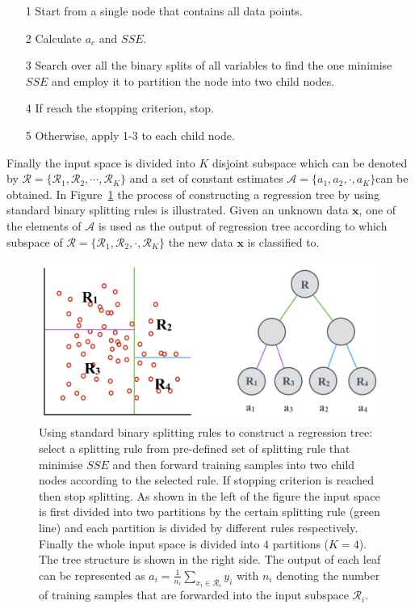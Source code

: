 \documentclass{tutmscthesis}[2010/09/22]
\numberwithin{equation}{section}
\numberwithin{table}{section}
\numberwithin{figure}{section}
\renewcommand{\vec}[1]{\bm{#1}}
\begin{document}
\begin{itemize}
\item[1] Start from a single node that contains all data points. 
\item[2] Calculate $a_c$ and $SSE$.
\item[3] Search over all the binary splits of all variables to find the one minimise $SSE$ and employ it to partition the node into two child nodes.
\item[4] If reach the stopping criterion, stop.
\item[5] Otherwise, apply 1-3 to each child node.
\end{itemize}

Finally the input space is divided into $K$ disjoint subspace which can be denoted by $\mathcal{R} = \{\mathcal{R}_1, \mathcal{R}_2, \cdots, \mathcal{R}_K \}$ and a set of constant estimates $\mathcal{A}=\{a_1, a_2, \cdot, a_K\}$can be obtained.
In Figure~\ref{Fig:regressiontree} the process of constructing a regression tree by using standard binary splitting rules is illustrated. Given an unknown data $\vec{x}$, one of the elements of $\mathcal{A}$ is used as the output of regression tree according to which subspace of $\mathcal{R} = \{\mathcal{R}_1, \mathcal{R}_2, \cdot, \mathcal{R}_K \}$ the new data $\vec{x}$ is classified to.  


\begin{figure}[t]
\centering
\includegraphics[width=0.98\linewidth]{regressiontree.png}
\caption{Using standard binary splitting rules to construct a regression tree: select a splitting rule from pre-defined set of splitting rule that minimise $SSE$ and then forward training samples into two child nodes according to the selected rule. 
If stopping criterion is reached then stop splitting. 
As shown in the left of the figure the input space is first divided into two partitions by the certain splitting rule (green line) and each partition is divided by different rules respectively. Finally the whole input space is divided into $4$ partitions ($K=4$). 
The tree structure is shown in the right side. 
The output of each leaf can be represented as $a_i =  \frac{1}{n_i}\sum_{x_i \in \mathcal{R}_i}y_i$ with $n_i$ denoting the number of training samples that are forwarded into the input subspace $\mathcal{R}_i$. }
\label{Fig:regressiontree} %
\end{figure}
\end{document}
